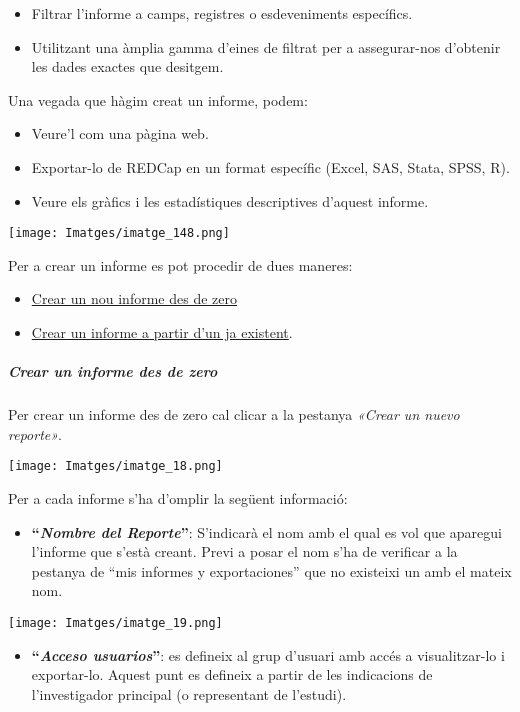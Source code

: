 \documentclass[
]{article}
\providecommand{\tightlist}{%
  \setlength{\itemsep}{0pt}\setlength{\parskip}{0pt}}
\begin{document}
\begin{itemize}
\tightlist
\item
  Filtrar l'informe a camps, registres o esdeveniments específics.
\item
  Utilitzant una àmplia gamma d'eines de filtrat per a assegurar-nos d'obtenir les dades exactes que desitgem.
\end{itemize}

Una vegada que hàgim creat un informe, podem:

\begin{itemize}
\tightlist
\item
  Veure'l com una pàgina web.
\item
  Exportar-lo de REDCap en un format específic (Excel, SAS, Stata, SPSS, R).
\item
  Veure els gràfics i les estadístiques descriptives d'aquest informe.
\end{itemize}

\texttt{[image: Imatges/imatge\_148.png]}

Per a crear un informe es pot procedir de dues maneres:

\begin{itemize}
\tightlist
\item
  \protect\hyperlink{en13}{Crear un nou informe des de zero}
\item
  \protect\hyperlink{en14}{Crear un informe a partir d'un ja existent}.
\end{itemize}

\hypertarget{en13}{%
\subparagraph{Crear un informe des de zero}\label{en13}}

Per crear un informe des de zero cal clicar a la pestanya \emph{«Crear un nuevo reporte»}.

\texttt{[image: Imatges/imatge\_18.png]}

Per a cada informe s'ha d'omplir la següent informació:

\begin{itemize}
\tightlist
\item
  \textbf{``\emph{Nombre del Reporte}''}: S'indicarà el nom amb el qual es vol que aparegui l'informe que s'està creant. Previ a posar el nom s'ha de verificar a la pestanya de ``mis informes y exportaciones'' que no existeixi un amb el mateix nom.
\end{itemize}

\texttt{[image: Imatges/imatge\_19.png]}

\begin{itemize}
\tightlist
\item
  \textbf{``\emph{Acceso usuarios}''}: es defineix al grup d'usuari amb accés a visualitzar-lo i exportar-lo. Aquest punt es defineix a partir de les indicacions de l'investigador principal (o representant de l'estudi).
\end{itemize}
\end{document}
